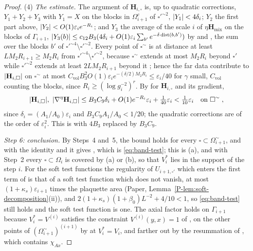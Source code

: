 \documentclass[11pt]{preprint}
\newcommand{\dist}{\operatorname{dist}}
\DeclarePairedDelimiter{\abs}{\lvert}{\rvert}
\numberwithin{equation}{section}
\theoremstyle{definition}
\theoremstyle{remark}
\theoremstyle{plain}
\begin{document}
\begin{proof}
(4) \emph{The estimate.} The argument of $\mathbf H_{i,\square}$ is, up to quadratic corrections, $Y_1 + Y_2 + Y_3$ with $Y_1 = X$ on the blocks in $\Omega_{i+1}^c$ of $\square'^{\sim2}$, $\abs{Y_1} < 4\delta_i$; $Y_2$ the first part above, $\abs{Y_2} < O(1)\varepsilon_ie^{-R_i}$; and $Y_3$ the average of the scale $i$ of $\eta\mathbf H_{\mathrm{mix}}$ on the blocks of $\Gamma_{i+1}$, $\abs{Y_3(b)} \leq c_{12}B_3(4\delta_i + O(1)\varepsilon_i\sum_{b'}e^{-\delta\dist(b, b')})$ by \cite[(190)]{BalabanVAR} and \cite[(159)--(163)]{BalabanAVG}, the sum over the blocks $b'$ of $\square'^{\sim4} \setminus \square'^{\sim2}$. Every point of $\square^\sim$ is at distance at least $LM_2R_{i+1} \geq M_2R_i$ from $\square'^{\sim4} \setminus \square'^{\sim2}$, because $\square^\sim$ extends at most $M_2R_i$ beyond $\square'$ while $\square'^{\sim2}$ extends at least $2LM_2R_{i+1}$ beyond it \cite[p.~245]{BalabanCRE}; hence the far data contribute to $\abs{\mathbf H_{i,\square}}$ on $\square^\sim$ at most $C_{\mathrm{vol}}B_3^2O(1)\varepsilon_ie^{-(\delta/2)M_2R_i} \leq \varepsilon_i/40$ for $\gamma$ small, $C_{\mathrm{vol}}$ counting the blocks, since $R_i \geq (\log g_i^{-2})^r$. By \cite[(190)]{BalabanVAR} for $\mathbf H_{i,\square}$ and its gradient,
\[
    \abs{\mathbf H_{i,\square}},\ \abs{\nabla^\eta\mathbf H_{i,\square}} \leq B_3C_9\delta_i + O(1)e^{-R_i}\varepsilon_i + \tfrac{1}{40}\varepsilon_i < \tfrac{1}{10}\varepsilon_i
    \quad\text{on } \square^\sim\;,
\]
since $\delta_i = (A_1/A_0)\varepsilon_i$ and $B_3C_9A_1/A_0 < 1/20$; the quadratic corrections are of the order of $\varepsilon_i^2$. This is \cite[(3.7)]{BalabanCRE} with $4B_3$ replaced by $B_3C_9$.

\emph{Step 6: conclusion.} By Steps~4 and~5, the bound \cite[(3.7)]{BalabanCRE} holds for every $\square \subset \Omega_{i+1}^\sim$, and with the identity \cite[(3.6)]{BalabanCRE} and \cite[(1.43)]{BalabanREG} it gives \cite[(3.8)]{BalabanCRE}, which is \eqref{eq:band-test}; this is (a), and with Step~2 every $\square \subset \Omega_i$ is covered by (a) or (b), so that $V^*_i$ lies in the support of the step $i$. For the soft test functions the regularity of $U_{i+1,\square'}$ which enters the first term of \cite[(3.8)]{BalabanCRE} is that of a soft test function which does not vanish, at most $(1 + \kappa_s)\varepsilon_{i+1}$ times the plaquette area (Paper, Lemma~\ref{P-lem:soft-decomposition}(ii)), and $2(1 + \kappa_s)(1 + \beta_0)L^{-2} + 4/10 < 1$, so \eqref{eq:band-test} still holds and the soft test function is one. The axial factor holds on $\Gamma_{i+1}$ because $V^*_i = V^{(i)}$ satisfies the constraint $V^{(i)}(y, x) = 1$ of \cite[(3.10)]{BalabanCRE}, on the other points of $(\Omega_{i+1}^\sim)^{(i+1)}$ by \cite[(3.9)]{BalabanCRE} at $V^*_i = V_i$, and farther out by the resummation of \cite[p.~267]{BalabanCRE}, which contains $\chi_{Ax}$.
\end{proof}
\end{document}
